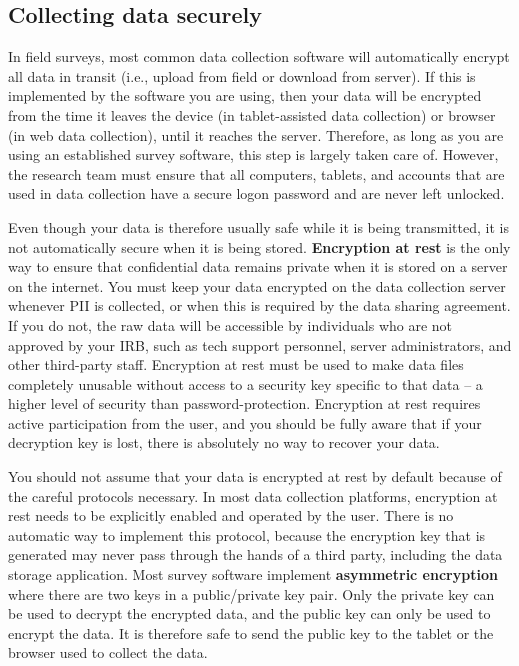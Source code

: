 \subsection{Collecting data securely}

In field surveys, most common data collection software will automatically encrypt
all data in transit (i.e., upload from field or download from server).
If this is implemented by the software you are using,
then your data will be encrypted from the time it leaves the device
(in tablet-assisted data collection) or browser (in web data collection),
until it reaches the server.
Therefore, as long as you are using an established survey software,
this step is largely taken care of.
However, the research team must ensure that all computers, tablets,
and accounts that are used in data collection have a secure logon
password and are never left unlocked.

Even though your data is therefore usually safe while it is being transmitted,
it is not automatically secure when it is being stored.
\textbf{Encryption at rest}
is the only way to ensure that confidential data remains private when it is stored on a
server on the internet.
You must keep your data encrypted on the data collection server whenever PII is collected,
or when this is required by the data sharing agreement.
If you do not, the raw data will be accessible by
individuals who are not approved by your IRB,
such as tech support personnel,
server administrators, and other third-party staff.
Encryption at rest must be used to make
data files completely unusable without access to a security key specific to that
data -- a higher level of security than password-protection.
Encryption at rest requires active participation from the user,
and you should be fully aware that if your decryption key is lost,
there is absolutely no way to recover your data.

You should not assume that your data is encrypted at rest by default because of
the careful protocols necessary.
In most data collection platforms,
encryption at rest needs to be explicitly enabled and operated by the user.
There is no automatic way to implement this protocol,
because the encryption key that is generated may
never pass through the hands of a third party,
including the data storage application.
Most survey software implement \textbf{asymmetric encryption}
where there are two keys in a public/private key pair.
Only the private key can be used to decrypt the encrypted data,
and the public key can only be used to encrypt the data.
It is therefore safe to send the public key
to the tablet or the browser used to collect the data.

